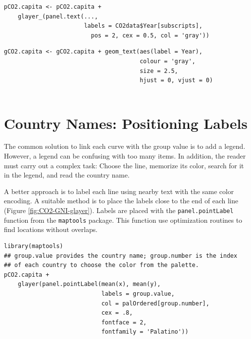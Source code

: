 \lstset{language=r,label= ,caption= ,captionpos=b,numbers=none}
\begin{lstlisting}
pCO2.capita <- pCO2.capita +
    glayer_(panel.text(...,
                       labels = CO2data$Year[subscripts],
                         pos = 2, cex = 0.5, col = 'gray'))
\end{lstlisting}

\lstset{language=r,label= ,caption= ,captionpos=b,numbers=none}
\begin{lstlisting}
gCO2.capita <- gCO2.capita + geom_text(aes(label = Year),
                                       colour = 'gray',
                                       size = 2.5,
                                       hjust = 0, vjust = 0)
  
\end{lstlisting}

\section{Country Names: Positioning Labels}
\label{sec:org17c924e}
The common solution to link each curve with the group value is to add
a legend. However, a legend can be confusing with too many items. In
addition, the reader must carry out a complex task: Choose the line,
memorize its color, search for it in the legend, and read the country
name.

A better approach is to label each line using nearby text with the
same color encoding. A suitable method is to place the labels
close to the end of each line (Figure
\ref{fig:CO2-GNI-glayer}). Labels are placed with the
\texttt{panel.pointLabel} function from the \texttt{maptools} package. This
function use optimization routines to find locations without
overlaps.


\lstset{language=r,label= ,caption= ,captionpos=b,numbers=none}
\begin{lstlisting}
library(maptools)  
## group.value provides the country name; group.number is the index
## of each country to choose the color from the palette.
pCO2.capita +
    glayer(panel.pointLabel(mean(x), mean(y),
                            labels = group.value,
                            col = palOrdered[group.number],
                            cex = .8,
                            fontface = 2,
                            fontfamily = 'Palatino'))
\end{lstlisting}

